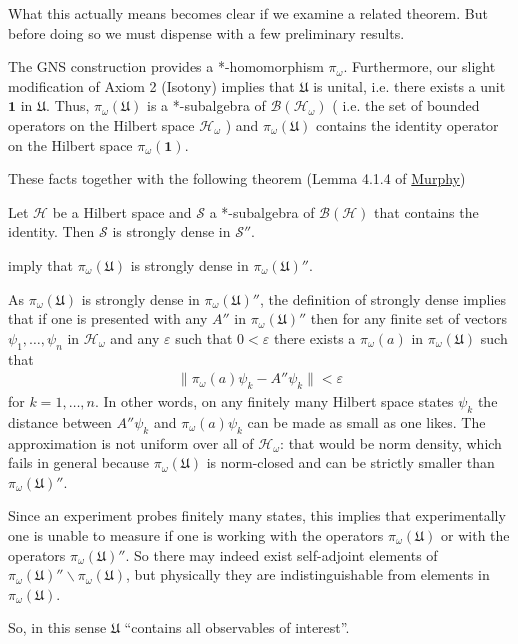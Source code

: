 What this actually means becomes clear if we examine a related theorem. But before doing so we must dispense with a few preliminary results.

The GNS construction provides a *-homomorphism $\pi_\omega$. Furthermore, our slight modification of Axiom 2 (Isotony) implies that $\mathfrak{U}$ is unital, i.e. there exists a unit $\mathbf{1}$ in $\mathfrak{U}$. Thus, $\pi_\omega(\mathfrak{U})$ is a *-subalgebra of $\mathcal{B}(\mathcal{H}_\omega)$ ( i.e. the set of bounded operators on the Hilbert space $\mathcal{H}_\omega$ ) and $\pi_\omega(\mathfrak{U})$ contains the identity operator on the Hilbert space $\pi_\omega(\mathbf{1})$.

These facts together with the following theorem (Lemma 4.1.4 of \href{https://doi.org/10.1016/C2009-0-22289-6}{Murphy})
\begin{theorem}
    Let $\mathcal{H}$ be a Hilbert space and $\mathcal{S}$ a *-subalgebra of $\mathcal{B}(\mathcal{H})$ that contains the identity. Then $\mathcal{S}$ is strongly dense in $\mathcal{S}''$.
\end{theorem}
\noindent imply that $\pi_\omega(\mathfrak{U})$ is strongly dense in $\pi_\omega(\mathfrak{U})''$.

As $\pi_\omega(\mathfrak{U})$ is strongly dense in $\pi_\omega(\mathfrak{U})''$, the definition of strongly dense implies that if one is presented with any $A''$ in $\pi_\omega(\mathfrak{U})''$ then for any finite set of vectors $\psi_1, \dots, \psi_n$ in $\mathcal{H}_\omega$ and any $\varepsilon$ such that $0 < \varepsilon$ there exists a $\pi_\omega(a)$ in $\pi_\omega(\mathfrak{U})$ such that
\begin{align}
    \| \pi_\omega(a)\psi_k - A''\psi_k \| < \varepsilon
\end{align}
for $k = 1, \dots, n$. In other words, on any finitely many Hilbert space states $\psi_k$ the distance between $A''\psi_k$ and $\pi_\omega(a)\psi_k$ can be made as small as one likes. The approximation is not uniform over all of $\mathcal{H}_\omega$: that would be norm density, which fails in general because $\pi_\omega(\mathfrak{U})$ is norm-closed and can be strictly smaller than $\pi_\omega(\mathfrak{U})''$.

Since an experiment probes finitely many states, this implies that experimentally one is unable to measure if one is working with the operators $\pi_\omega(\mathfrak{U})$ or with the operators $\pi_\omega(\mathfrak{U})''$. So there may indeed exist self-adjoint elements of $\pi_\omega(\mathfrak{U})'' \backslash \pi_\omega(\mathfrak{U})$, but physically they are indistinguishable from elements in $\pi_\omega(\mathfrak{U})$.

So, in this sense $\mathfrak{U}$ ``contains all observables of interest''.
